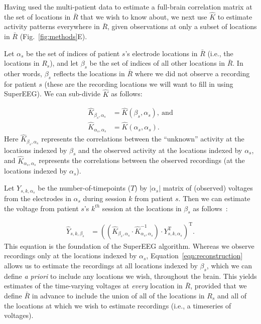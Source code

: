 \documentclass[11pt]{article}
\begin{document}
Having used the multi-patient data to estimate a full-brain
correlation matrix at the set of locations in $\bar{R}$ that we wish
to know about, we next use $\hat{K}$ to estimate activity patterns
everywhere in $\bar{R}$, given observations at only a subset of
locations in $\bar{R}$ (Fig.~\ref{fig:methods}E).

Let $\alpha_s$ be the set of indices of patient $s$'s electrode locations in
$\bar{R}$ (i.e., the locations in $R_s$), and let $\beta_s$ be the set of indices of all other
locations in $\bar{R}$. In other words, $\beta_s$ reflects the locations
in $\bar{R}$ where we did not observe a recording for patient $s$
(these are the recording locations we will want to fill in using SuperEEG).
We can sub-divide $\hat{K}$ as follows:

\begin{align}
\hat{K}_{\beta_s,\alpha_s} &= \hat{K}(\beta_s,\alpha_s),~\mathrm{and}\label{eqn:Kba}\\
\hat{K}_{\alpha_s,\alpha_s} &= \hat{K}(\alpha_s,\alpha_s)\label{eqn:Kaa}.
\end{align}
Here $\hat{K}_{\beta_s, \alpha_s}$ represents the correlations between
the ``unknown'' activity at the locations indexed by $\beta_s$ and the
observed activity at the locations indexed by $\alpha_s$, and
$\hat{K}_{\alpha_s, \alpha_s}$ represents the correlations between the
observed recordings (at the locations indexed by $\alpha_s$).

Let $Y_{s,k,\alpha_s}$ be the number-of-timepoints ($T$) by
$\left|\alpha_s\right|$ matrix of (observed) voltages from the electrodes in
$\alpha_s$ during session $k$ from patient $s$. Then we can estimate the
voltage from patient $s$'s $k^{th}$ session at the locations in
$\beta_s$ as follows~\citep{Rasm06}:

\begin{align}
\hat{Y}_{s,k,\beta_s} &= ((\hat{K}_{\beta_s,\alpha_s}\cdot\hat{K}_{\alpha_s,\alpha_s}^{-1})\cdot Y_{s,k,\alpha_s}^\mathrm{T})^\mathrm{T}.\label{eqn:reconstruction}
\end{align}
This equation is the foundation of the SuperEEG algorithm.  Whereas we
observe recordings only at the locations indexed by $\alpha_s$,
Equation~\ref{eqn:reconstruction} allows us to estimate the recordings
at all locations indexed by $\beta_s$, which we can define \textit{a priori}
to include any locations we wish, throughout the brain.  This yields
estimates of the time-varying voltages at \textit{every} location in
$\bar{R}$, provided that we define $\bar{R}$ in advance to include the
union of all of the locations in $R_s$ and all of the locations
at which we wish to estimate recordings (i.e., a timeseries of
voltages).
\end{document}
